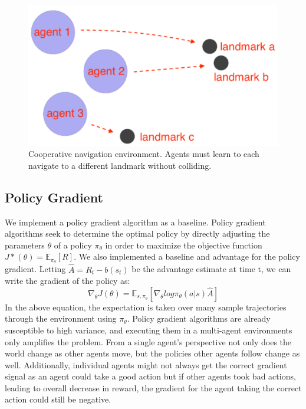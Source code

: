 \documentclass{article}
\begin{document}
\begin{figure}
\begin{center}
\includegraphics[scale=0.5]{env-image}
\end{center}
\caption{Cooperative navigation environment. Agents must learn to each navigate to a different landmark without colliding.}
\end{figure}

\subsection{Policy Gradient}
We implement a policy gradient algorithm as a baseline. Policy gradient algorithms seek to determine the optimal policy by directly adjusting the parameters $\theta$ of a policy $\pi_\theta$ in order to maximize the objective function $J*(\theta) = \mathbb{E}_{\pi_\theta}[R]$. We also implemented a baseline and advantage for the policy gradient. Letting $\hat{A} = R_t - b(s_t)$ be the advantage estimate at time t, we can write the gradient of the policy as:
$$\nabla_\theta J(\theta) = \mathbb{E}_{s,\pi_\theta}[\nabla_\theta log \pi_\theta(a|s)\hat{A}]$$
In the above equation, the expectation is taken over many sample trajectories through the environment using $\pi_\theta$. Policy gradient algorithms are already susceptible to  high variance, and executing them in a multi-agent environments only amplifies the problem. From a single agent's perspective not only does the world change as other agents move, but the policies other agents follow change as well. Additionally, individual agents might not always get the correct gradient signal as an agent could take a good action but if other agents took bad actions, leading to overall decrease in reward, the gradient for the agent taking the correct action could still be negative.
\end{document}
